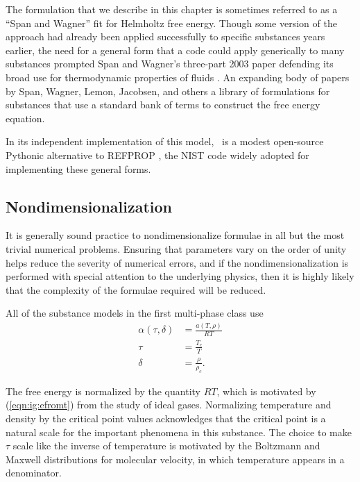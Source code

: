 The formulation that we describe in this chapter is sometimes referred to as a ``Span and Wagner'' fit for Helmholtz free energy.  Though some version of the approach had already been applied successfully to specific substances years earlier, the need for a general form that a code could apply generically to many substances prompted Span and Wagner's three-part 2003 paper defending its broad use for thermodynamic properties of fluids \cite{span:2003:1, span:2003:2, span:2003:3}.  An expanding body of papers by Span, Wagner, Lemon, Jacobsen, and others a library of formulations for substances that use a standard bank of terms to construct the free energy equation.

In its independent implementation of this model, \PM\ is a modest open-source Pythonic alternative to REFPROP \cite{refprop}, the NIST code widely adopted for implementing these general forms.

\subsection{Nondimensionalization}

It is generally sound practice to nondimensionalize formulae in all but the most trivial numerical problems.  Ensuring that parameters vary on the order of unity helps reduce the severity of numerical errors, and if the nondimensionalization is performed with special attention to the underlying physics, then it is highly likely that the complexity of the formulae required will be reduced.

All of the substance models in the first multi-phase class use
\begin{subequations}
\begin{align}
\alpha(\tau,\delta) &= \frac{a(T,\rho)}{R T}\\
\tau &= \frac{T_c}{T}\\
\delta &= \frac{\rho}{\rho_c}.
\end{align}
\end{subequations}

The free energy is normalized by the quantity $R T$, which is motivated by (\ref{eqn:ig:efromt}) from the study of ideal gases.  Normalizing temperature and density by the critical point values acknowledges that the critical point is a natural scale for the important phenomena in this substance.  The choice to make $\tau$ scale like the inverse of temperature is motivated by the Boltzmann and Maxwell distributions for molecular velocity, in which temperature appears in a denominator.

